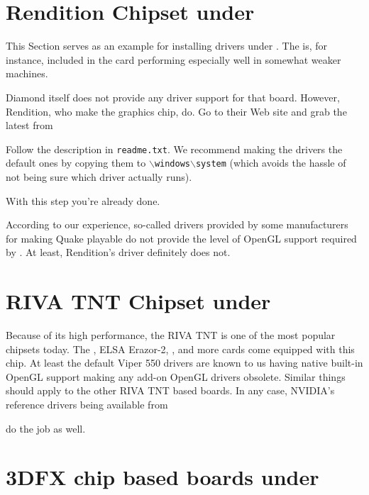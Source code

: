 \section{Rendition Chipset under
 \label{renditionwin}}

This Section serves as an example for installing  drivers under
. The  is, for instance, included in
the  card performing especially well in somewhat weaker
machines.

Diamond itself does not provide any  driver support for that board.
However, Rendition, who make the graphics chip, do. Go to their Web site and grab the
latest   from


 \noindent
Follow the description in \texttt{readme.txt}. We recommend making
the drivers the default ones by copying them to
\texttt{$\backslash$windows$\backslash$system} (which avoids the
hassle of not being sure which driver actually runs).

With this step you're already done.

According to our experience, so-called  drivers
provided by some manufacturers for making Quake playable do not
provide the level of OpenGL support required by {\FlightGear}. At
least, Rendition's  driver definitely does not.

\section{RIVA TNT Chipset under
 \label{rivatnt}}

Because of its high performance, the RIVA TNT is one of the most popular chipsets today.
The ,  ELSA Erazor-2, , and
more cards come equipped with this chip. At least the default Viper 550 drivers are known
to us having native built-in OpenGL support making any add-on OpenGL drivers obsolete.
Similar things should apply to the other RIVA TNT based boards. In any case, NVIDIA's
reference drivers being available from


\noindent
 do the job as well.

\section{3DFX chip based boards under
 \label{3DFXwin98}}

